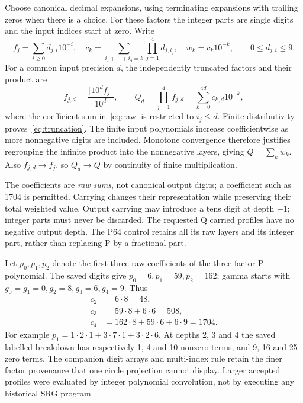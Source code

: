 \documentclass[11pt,a4paper]{article}
\begin{document}
Choose canonical decimal expansions, using terminating expansions with trailing zeros when there is a choice. For these factors the integer parts are single digits and the input indices start at zero. Write
\begin{equation}
f_j=\sum_{i\ge0}d_{j,i}10^{-i},\quad
c_k=\sum_{i_1+\cdots+i_4=k}\prod_{j=1}^4d_{j,i_j},\quad
w_k=c_k10^{-k},\qquad 0\le d_{j,i}\le9.
\label{eq:raw}
\end{equation}
For a common input precision $d$, the independently truncated factors and their product are
\begin{equation}
f_{j,d}=\frac{\lfloor10^d f_j\rfloor}{10^d},\qquad
Q_d=\prod_{j=1}^4 f_{j,d}
=\sum_{k=0}^{4d}c_{k,d}10^{-k},
\label{eq:truncation}
\end{equation}
where the coefficient sum in~\eqref{eq:raw} is restricted to $i_j\le d$. Finite distributivity proves~\eqref{eq:truncation}. The finite input polynomials increase coefficientwise as more nonnegative digits are included. Monotone convergence therefore justifies regrouping the infinite product into the nonnegative layers, giving $Q=\sum_k w_k$. Also $f_{j,d}\to f_j$, so $Q_d\to Q$ by continuity of finite multiplication.

The coefficients are \emph{raw sums}, not canonical output digits; a coefficient such as 1704 is permitted. Carrying changes their representation while preserving their total weighted value. Output carrying may introduce a tens digit at depth $-1$; integer parts must never be discarded. The requested Q carried profiles have no negative output depth. The P64 control retains all its raw layers and its integer part, rather than replacing P by a fractional part.

Let $p_0,p_1,p_2$ denote the first three raw coefficients of the three-factor P polynomial. The saved digits give $p_0=6,p_1=59,p_2=162$; gamma starts with $g_0=g_1=0,g_2=8,g_3=6,g_4=9$. Thus
\begin{align}
c_2&=6\cdot8=48,\nonumber\\
c_3&=59\cdot8+6\cdot6=508,\nonumber\\
c_4&=162\cdot8+59\cdot6+6\cdot9=1704.
\label{eq:earlycoeff}
\end{align}
For example $p_1=1\cdot2\cdot1+3\cdot7\cdot1+3\cdot2\cdot6$. At depths 2, 3 and 4 the saved labelled breakdown has respectively 1, 4 and 10 nonzero terms, and 9, 16 and 25 zero terms. The companion digit arrays and multi-index rule retain the finer factor provenance that one circle projection cannot display. Larger accepted profiles were evaluated by integer polynomial convolution, not by executing any historical SRG program.
\end{document}
